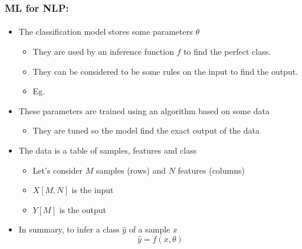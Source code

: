 \documentclass[xcolor=table]{beamer}
\begin{document}
	\begin{frame}
		\frametitle{ML for NLP: \insertsection}
		\framesubtitle{\insertsubsection}
	
		\begin{itemize}
			\item The classification model stores some parameters $\theta$
			\begin{itemize}
				\item They are used by an inference function $ f $ to find the perfect class.
				\item They can be considered to be some rules on the input to find the output.
				\item Eg. 
			\end{itemize}
			\item These parameters are trained using an algorithm based on some data
			\begin{itemize}
				\item They are tuned so the model find the exact output of the data
			\end{itemize}
			\item The data is a table of samples, features and class
			\begin{itemize}
				\item Let's consider $ M $ samples (rows) and $ N $ features (columns)
				\item $ X[M, N] $ is the input
				\item $ Y[M] $ is the output
			\end{itemize}
			\item In summary, to infer a class $ \hat{y} $ of a sample $ x $
			\[\hat{y} = f(x, \theta)\]
		\end{itemize}
		
	\end{frame}
\end{document}
